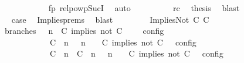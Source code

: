 \begin{isabellebody}
\ \ \ \ \ \ \ \ \ \ \isamarkupfalse%
\ fp\ relpowp{\isacharunderscore}Suc{\isacharunderscore}I{}\ \isamarkupfalse%
\ auto\isanewline
\ \ \ \ \ \ \ \ \isamarkupfalse%
\ rc\ \isamarkupfalse%
\ {\isacharquery}thesis\ \isamarkupfalse%
\ blast\isanewline
\ \ \ \ \ \ \isamarkupfalse%
\isanewline
\ \ \ \ \ \ \isamarkupfalse%
\ \isamarkupfalse%
\ {\isacharquery}case\ \isamarkupfalse%
\ Implies{\isachardot}prems{\isacharparenleft}{}{\isacharparenright}\ \isamarkupfalse%
\ blast\isanewline
\ \ \isamarkupfalse%
\isanewline
\ \ \ \ \isamarkupfalse%
\ {\isacharparenleft}ImpliesNot\ C\ C\isanewline
\ \ \ \ \ \ \isamarkupfalse%
\ branches{\isacharcolon}\ {\isacartoucheopen}{\isasymlbrakk}\ {\isasymGamma}{\isacharcomma}\ n\ {\isasymturnstile}\ {\isacharparenleft}{\isacharparenleft}C\ implies\ not\ C\ {\isacharhash}\ {\isasymPsi}{\isacharparenright}\ {\isasymtriangleright}\ {\isasymPhi}\ {\isasymrbrakk}\isactrlsub c\isactrlsub o\isactrlsub n\isactrlsub f\isactrlsub i\isactrlsub g\isanewline
\ \ \ \ \ \ \ \ \ \ {\isacharequal}\ {\isasymlbrakk}\ {\isacharparenleft}{\isacharparenleft}C\ {\isasymnot}{\isasymUp}\ n{\isacharparenright}\ {\isacharhash}\ {\isasymGamma}{\isacharparenright}{\isacharcomma}\ n\ {\isasymturnstile}\ {\isasymPsi}\ {\isasymtriangleright}\ {\isacharparenleft}{\isacharparenleft}C\ implies\ not\ C\ {\isacharhash}\ {\isasymPhi}{\isacharparenright}\ {\isasymrbrakk}\isactrlsub c\isactrlsub o\isactrlsub n\isactrlsub f\isactrlsub i\isactrlsub g\isanewline
\ \ \ \ \ \ \ \ \ \ {\isasymunion}\ {\isasymlbrakk}\ {\isacharparenleft}{\isacharparenleft}C\ {\isasymUp}\ n{\isacharparenright}\ {\isacharhash}\ {\isacharparenleft}C\ {\isasymnot}{\isasymUp}\ n{\isacharparenright}\ {\isacharhash}\ {\isasymGamma}{\isacharparenright}{\isacharcomma}\ n\ {\isasymturnstile}\ {\isasymPsi}\ {\isasymtriangleright}\ {\isacharparenleft}{\isacharparenleft}C\ implies\ not\ C\ {\isacharhash}\ {\isasymPhi}{\isacharparenright}\ {\isasymrbrakk}\isactrlsub c\isactrlsub o\isactrlsub n\isactrlsub f\isactrlsub i\isactrlsub g{\isacartoucheclose}\isanewline

\end{isabellebody}
